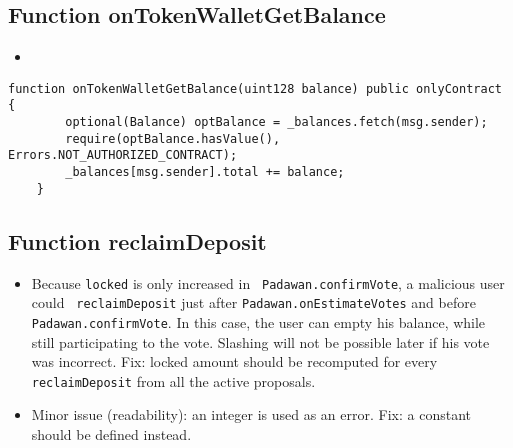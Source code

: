 \subsection{Function onTokenWalletGetBalance}

\begin{itemize}
\item {}
\end{itemize}

\begin{lstlisting}[firstnumber=222]
    function onTokenWalletGetBalance(uint128 balance) public onlyContract {
        optional(Balance) optBalance = _balances.fetch(msg.sender);
        require(optBalance.hasValue(), Errors.NOT_AUTHORIZED_CONTRACT);
        _balances[msg.sender].total += balance;
    }
\end{lstlisting}

\subsection{Function reclaimDeposit}

\begin{itemize}
\item {}
  {Because {\tt locked} is only increased in {\tt
      Padawan.confirmVote}, a malicious user could {\tt
      reclaimDeposit} just after {\tt Padawan.onEstimateVotes} and
    before {\tt Padawan.confirmVote}. In this case, the user can empty
    his balance, while still participating to the vote. Slashing will
    not be possible later if his vote was incorrect. Fix: locked
    amount should be recomputed for every {\tt reclaimDeposit} from
    all the active proposals.}

\item Minor issue (readability): an integer is used as an error. Fix:
  a constant should be defined instead.
\end{itemize}

